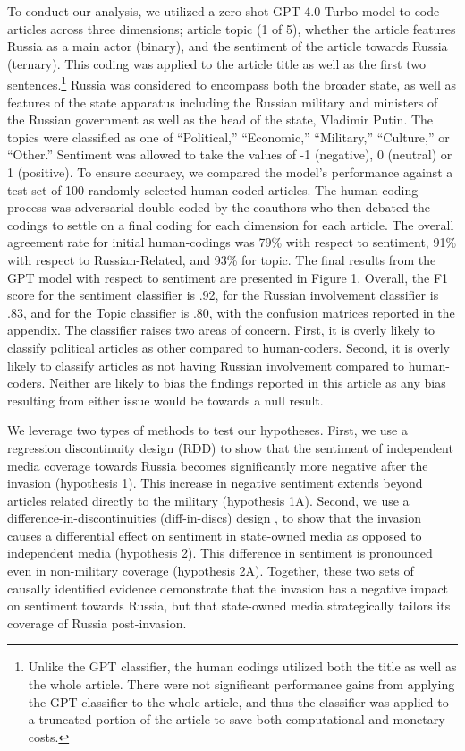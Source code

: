 \documentclass[12pt]{article}
\begin{document}
To conduct our analysis, we utilized a zero-shot GPT 4.0 Turbo model to code articles across three dimensions; article topic (1 of 5), whether the article features Russia as a main actor (binary), and the sentiment of the article towards Russia (ternary). This coding was applied to the article title as well as the first two sentences.\footnote{Unlike the GPT classifier, the human codings utilized both the title as well as the whole article. There were not significant performance gains from applying the GPT classifier to the whole article, and thus the classifier was applied to a truncated portion of the article to save both computational and monetary costs.} Russia was considered to encompass both the broader state, as well as features of the state apparatus including the Russian military and ministers of the Russian government as well as the head of the state, Vladimir Putin. The topics were classified as one of ``Political,'' ``Economic,'' ``Military,'' ``Culture,'' or ``Other.'' Sentiment was allowed to take the values of -1 (negative), 0 (neutral) or 1 (positive). To ensure accuracy, we compared the model's performance against a test set of 100 randomly selected human-coded articles. The human coding process was adversarial double-coded by the coauthors who then debated the codings to settle on a final coding for each dimension for each article. The overall agreement rate for initial human-codings was 79\% with respect to sentiment, 91\% with respect to Russian-Related, and 93\% for topic. The final results from the GPT model with respect to sentiment are presented in Figure 1. Overall, the F1 score for the sentiment classifier is .92, for the Russian involvement classifier is .83, and for the Topic classifier is .80, with the confusion matrices reported in the appendix. The classifier raises two areas of concern. First, it is overly likely to classify political articles as other compared to human-coders. Second, it is overly likely to classify articles as not having Russian involvement compared to human-coders. Neither are likely to bias the findings reported in this article as any bias resulting from either issue would be towards a null result.

We leverage two types of methods to test our hypotheses. First, we use a regression discontinuity design (RDD) to show that the sentiment of independent media coverage towards Russia becomes significantly more negative after the invasion (hypothesis 1). This increase in negative sentiment extends beyond articles related directly to the military (hypothesis 1A). Second, we use a difference-in-discontinuities (diff-in-discs) design \autocite{grembi_fiscal_2016}, \autocite{toral_how_2024} to show that the invasion causes a differential effect on sentiment in state-owned media as opposed to independent media (hypothesis 2). This difference in sentiment is pronounced even in non-military coverage (hypothesis 2A). Together, these two sets of causally identified evidence demonstrate that the invasion has a negative impact on sentiment towards Russia, but that state-owned media strategically tailors its coverage of Russia post-invasion.
\end{document}
